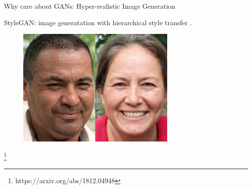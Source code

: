 \documentclass[notheorems]{beamer}
\newcommand{\source}[1]{{\let\thefootnote\relax\footnote{{\tiny #1}}}}
\begin{document}
    \begin{frame}{Why care about GANs: Hyper-realistic Image Generation}

        \begin{center}
            StyleGAN: image generatation with hierarchical style transfer \cite{karras2018style}.
        \end{center}

        \begin{figure}
            \centering
            \includegraphics[width=0.7\textwidth]{figures/style_transfer}
        \end{figure}

        \source{https://arxiv.org/abs/1812.04948}
    \end{frame}
\end{document}
